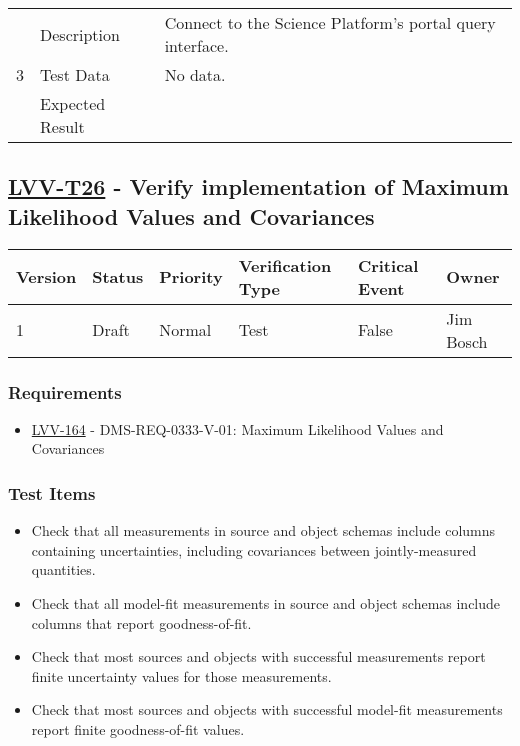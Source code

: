 \begin{longtable}[]{p{1.3cm}p{2cm}p{13cm}}
            \multirow{3}{*}{ 3 } & Description &
            \begin{minipage}[t]{13cm}{\footnotesize
            Connect to the Science Platform's portal query interface.

            \vspace{\dp0}
            } \end{minipage} \\ \cline{2-3}
            & Test Data &
            \begin{minipage}[t]{13cm}{\footnotesize
                No data.
                \vspace{\dp0}
            } \end{minipage} \\ \cline{2-3}
            & Expected Result &
        \\ \midrule
    \end{longtable}

\subsection{\href{https://jira.lsstcorp.org/secure/Tests.jspa\#/testCase/LVV-T26}{LVV-T26}
    - Verify implementation of Maximum Likelihood Values and Covariances}\label{lvv-t26}

\begin{longtable}[]{llllll}
\toprule
Version & Status & Priority & Verification Type & Critical Event & Owner
\\\midrule
1 & Draft & Normal &
Test & False & Jim Bosch
\\\bottomrule
\end{longtable}

\subsubsection{Requirements}
\begin{itemize}
\item \href{https://jira.lsstcorp.org/browse/LVV-164}{LVV-164} - DMS-REQ-0333-V-01: Maximum Likelihood Values and Covariances
\end{itemize}

\subsubsection{Test Items}
\begin{itemize}
\tightlist
\item
  Check that all measurements in source and object schemas include
  columns containing uncertainties, including covariances between
  jointly-measured quantities.
\item
  Check that all model-fit measurements in source and object schemas
  include columns that report goodness-of-fit.
\item
  Check that most sources and objects with successful measurements
  report finite uncertainty values for those measurements.
\item
  Check that most sources and objects with successful model-fit
  measurements report finite goodness-of-fit values.
\end{itemize}



